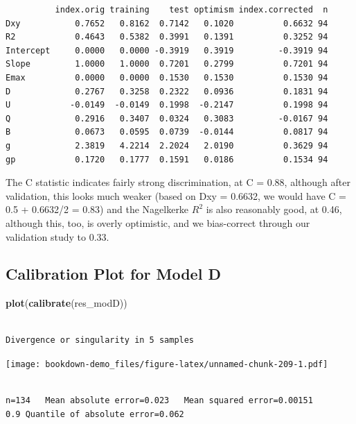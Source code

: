 \documentclass[]{book}
\newenvironment{Shaded}{\begin{snugshade}}{\end{snugshade}}
\newcommand{\KeywordTok}[1]{\textcolor[rgb]{0.13,0.29,0.53}{\textbf{#1}}}
\newcommand{\NormalTok}[1]{#1}
\theoremstyle{definition}
\theoremstyle{definition}
\theoremstyle{definition}
\theoremstyle{remark}
\begin{document}
\begin{verbatim}
          index.orig training    test optimism index.corrected  n
Dxy           0.7652   0.8162  0.7142   0.1020          0.6632 94
R2            0.4643   0.5382  0.3991   0.1391          0.3252 94
Intercept     0.0000   0.0000 -0.3919   0.3919         -0.3919 94
Slope         1.0000   1.0000  0.7201   0.2799          0.7201 94
Emax          0.0000   0.0000  0.1530   0.1530          0.1530 94
D             0.2767   0.3258  0.2322   0.0936          0.1831 94
U            -0.0149  -0.0149  0.1998  -0.2147          0.1998 94
Q             0.2916   0.3407  0.0324   0.3083         -0.0167 94
B             0.0673   0.0595  0.0739  -0.0144          0.0817 94
g             2.3819   4.2214  2.2024   2.0190          0.3629 94
gp            0.1720   0.1777  0.1591   0.0186          0.1534 94
\end{verbatim}

The C statistic indicates fairly strong discrimination, at C = 0.88,
although after validation, this looks much weaker (based on Dxy =
0.6632, we would have C = 0.5 + 0.6632/2 = 0.83) and the Nagelkerke
\(R^2\) is also reasonably good, at 0.46, although this, too, is overly
optimistic, and we bias-correct through our validation study to 0.33.

\subsection{Calibration Plot for Model
D}\label{calibration-plot-for-model-d}

\begin{Shaded}
\begin{Highlighting}[]
\KeywordTok{plot}\NormalTok{(}\KeywordTok{calibrate}\NormalTok{(res_modD))}
\end{Highlighting}
\end{Shaded}

\begin{verbatim}

Divergence or singularity in 5 samples
\end{verbatim}

\texttt{[image: bookdown-demo\_files/figure-latex/unnamed-chunk-209-1.pdf]}

\begin{verbatim}

n=134   Mean absolute error=0.023   Mean squared error=0.00151
0.9 Quantile of absolute error=0.062
\end{verbatim}
\end{document}
